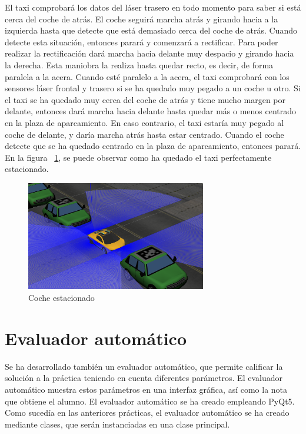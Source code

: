 El taxi comprobará los datos del láser trasero en todo momento para saber si está cerca del coche de atrás. El coche seguirá marcha atrás y girando hacia a la izquierda hasta que detecte que está demasiado cerca del coche de atrás. Cuando detecte esta situación, entonces parará y comenzará a rectificar. Para poder realizar la rectificación dará marcha hacia delante muy despacio y girando hacia la derecha. Esta maniobra la realiza hasta quedar recto, es decir, de forma paralela a la acera. Cuando esté paralelo a la acera, el taxi comprobará con los sensores láser frontal y trasero si se ha quedado muy pegado a un coche u otro. Si el taxi se ha quedado muy cerca del coche de atrás y tiene mucho margen por delante, entonces dará marcha hacia delante hasta quedar más o menos centrado en la plaza de aparcamiento. En caso contrario, el taxi estaría muy pegado al coche de delante, y daría marcha atrás hasta estar centrado. Cuando el coche detecte que se ha quedado centrado en la plaza de aparcamiento, entonces parará. En la figura ~\ref{fig.Posicion5}, se puede observar como ha quedado el taxi perfectamente estacionado.

\begin{figure}[H]
  \begin{center}
    \includegraphics[width=0.7\textwidth]{figures/Autopark/Posicion5.png}
		\caption{Coche estacionado}
		\label{fig.Posicion5}
		\end{center}
\end{figure}


\section{Evaluador automático}
Se ha desarrollado también un evaluador automático, que permite calificar la solución a la práctica teniendo en cuenta diferentes parámetros. El evaluador automático muestra estos parámetros en una interfaz gráfica, así como la nota que obtiene el alumno. El evaluador automático se ha creado empleando PyQt5. Como sucedía en las anteriores prácticas, el evaluador automático se ha creado mediante clases, que serán instanciadas en una clase principal. \\

